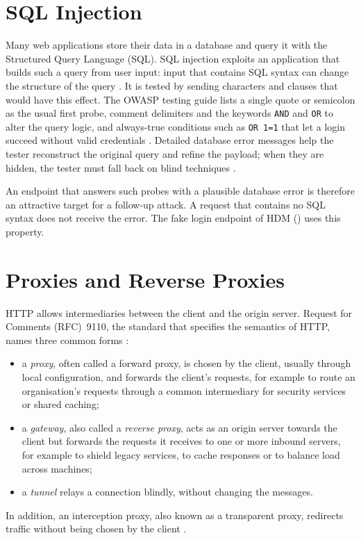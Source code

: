 \documentclass{rptuma}
\begin{document}
\section{SQL Injection}
\label{sec:bg.sqli}

Many web applications store their data in a database and query it with the Structured Query
Language (SQL). SQL injection exploits an application that builds such a query from user input:
input that contains SQL syntax can change the structure of the query \cite{owasp2020wstg}. It is
tested by sending characters and clauses that would have this effect. The OWASP testing guide lists
a single quote or semicolon as the usual first probe, comment delimiters and the keywords
\texttt{AND} and \texttt{OR} to alter the query logic, and always-true conditions such as
\texttt{OR 1=1} that let a login succeed without valid credentials \cite{owasp2020wstg}. Detailed
database error messages help the tester reconstruct the original query and refine the payload;
when they are hidden, the tester must fall back on blind techniques \cite{owasp2020wstg}.

An endpoint that answers such probes with a plausible database error is therefore an attractive
target for a follow-up attack. A request that contains no SQL syntax does not receive the error.
The fake login endpoint of HDM () uses this property.

\section{Proxies and Reverse Proxies}
\label{sec:bg.proxy}

HTTP allows intermediaries between the client and the origin server. Request for Comments (RFC)~9110,
the standard that specifies the semantics of HTTP, names three common forms \cite{rfc9110}:
\begin{itemize}
  \item a \emph{proxy}, often called a forward proxy, is chosen by the client, usually through local
    configuration, and forwards the client's requests, for example to route an organisation's
    requests through a common intermediary for security services or shared caching;
  \item a \emph{gateway}, also called a \emph{reverse proxy}, acts as an origin server towards the
    client but forwards the requests it receives to one or more inbound servers, for example to
    shield legacy services, to cache responses or to balance load across machines;
  \item a \emph{tunnel} relays a connection blindly, without changing the messages.
\end{itemize}
In addition, an interception proxy, also known as a transparent proxy, redirects traffic without
being chosen by the client \cite{rfc9110}.
\end{document}
